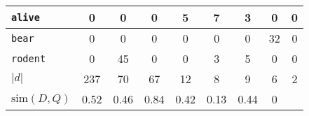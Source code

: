 \documentclass[a4paper, 11pt, accentcolor = tud3b]{tudreport}
\providecommand{\abs}[1]{\ensuremath{{\lvert #1 \rvert}}}
\begin{document}
\begin{table}[H]
\begin{tabular}{|l|c|c|c|c|c|c|c||c|}
                        \texttt{alive}  & \textcolor{irl}{0} & \textcolor{irl}{0} & \textcolor{irl}{0} &         5          &         7          &         3          & \textcolor{irl}{0} & 0 \\ \hline
                        \texttt{bear}   & \textcolor{irl}{0} & \textcolor{irl}{0} & \textcolor{irl}{0} & \textcolor{irl}{0} & \textcolor{irl}{0} & \textcolor{irl}{0} &         32          & 0\\ \hline
                        \texttt{rodent} & \textcolor{irl}{0} &         45         & \textcolor{irl}{0} & \textcolor{irl}{0} &         3          &         5          & \textcolor{irl}{0}  & 0\\ \hline\hline
                        \( \abs{d} \)   & 237                & 70                 & 67                 & 12                 & 8                  & 9                  & 6                & 2 \\ \hline
                        \( \text{sim}(D, Q) \) & 0.52 & 0.46 & 0.84 & 0.42 & 0.13 & 0.44 & 0 & \multicolumn{1}{c}{} \\ \cline{1-8}
                    \end{tabular}
                \end{table}
\end{document}
